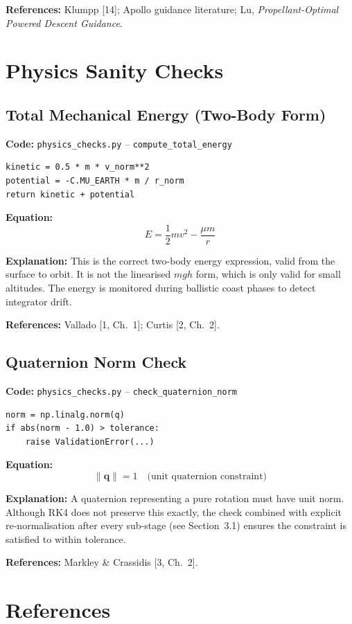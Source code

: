 \documentclass[12pt,a4paper]{article}
\begin{document}
\textbf{References:} Klumpp [14]; Apollo guidance literature; Lu, \textit{Propellant-Optimal Powered Descent Guidance}.

\section{Physics Sanity Checks}

\subsection{Total Mechanical Energy (Two-Body Form)}

\textbf{Code:} \texttt{physics\_checks.py} – \texttt{compute\_total\_energy}
\begin{verbatim}
kinetic = 0.5 * m * v_norm**2
potential = -C.MU_EARTH * m / r_norm
return kinetic + potential
\end{verbatim}

\textbf{Equation:}
\[
E = \frac{1}{2} m v^2 - \frac{\mu m}{r}
\]

\textbf{Explanation:} This is the correct two-body energy expression, valid from the surface to orbit. It is not the linearised $mgh$ form, which is only valid for small altitudes. The energy is monitored during ballistic coast phases to detect integrator drift.

\textbf{References:} Vallado [1, Ch.~1]; Curtis [2, Ch.~2].

\subsection{Quaternion Norm Check}

\textbf{Code:} \texttt{physics\_checks.py} – \texttt{check\_quaternion\_norm}
\begin{verbatim}
norm = np.linalg.norm(q)
if abs(norm - 1.0) > tolerance:
    raise ValidationError(...)
\end{verbatim}

\textbf{Equation:}
\[
\|\mathbf{q}\| = 1 \quad \text{(unit quaternion constraint)}
\]

\textbf{Explanation:} A quaternion representing a pure rotation must have unit norm. Although RK4 does not preserve this exactly, the check combined with explicit re-normalisation after every sub-stage (see Section~3.1) ensures the constraint is satisfied to within tolerance.

\textbf{References:} Markley \& Crassidis [3, Ch.~2].

\section*{References}
\end{document}
